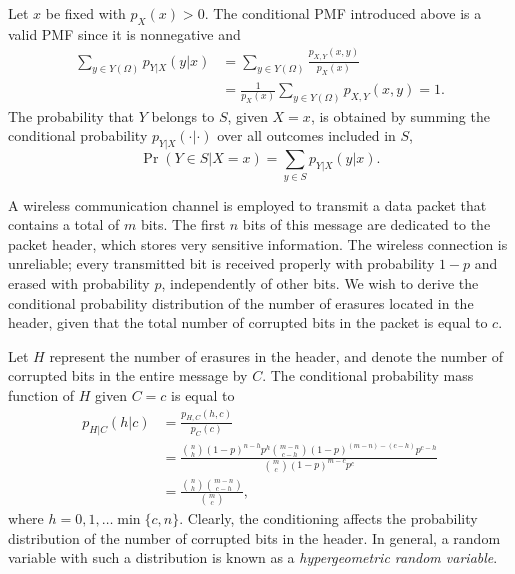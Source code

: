 Let $x$ be fixed with $p_X (x) > 0$.
The conditional PMF introduced above is a valid PMF since it is nonnegative and
\begin{equation*}
\begin{split}
\sum_{y \in Y(\Omega)} p_{Y|X} (y|x)
&= \sum_{y \in Y(\Omega)} \frac{p_{X,Y} (x,y)}{p_X (x)} \\
&= \frac{1}{p_X (x)} \sum_{y \in Y(\Omega)} p_{X,Y} (x,y) = 1.
\end{split}
\end{equation*}
The probability that $Y$ belongs to $S$, given $X = x$, is obtained by summing the conditional probability $p_{Y|X} (\cdot | \cdot)$ over all outcomes included in $S$,
\begin{equation*}
\Pr (Y \in S | X = x) = \sum_{y \in S} p_{Y|X} (y | x) .
\end{equation*}

\begin{example}
A wireless communication channel is employed to transmit a data packet that contains a total of $m$ bits.
The first $n$ bits of this message are dedicated to the packet header, which stores very sensitive information.
The wireless connection is unreliable; every transmitted bit is received properly with probability $1-p$ and erased with probability $p$, independently of other bits.
We wish to derive the conditional probability distribution of the number of erasures located in the header, given that the total number of corrupted bits in the packet is equal to $c$.

Let $H$ represent the number of erasures in the header, and denote the number of corrupted bits in the entire message by $C$.
The conditional probability mass function of $H$ given $C = c$ is equal to
\begin{equation*}
\begin{split}
p_{H|C} (h|c) &= \frac{p_{H,C} (h,c)}{p_C (c)} \\
&= \frac{\binom{n}{h} (1-p)^{n-h} p^h
\binom{m-n}{c-h} (1-p)^{(m-n)-(c-h)} p^{c - h}}{\binom{m}{c} (1-p)^{m-c} p^c} \\
&= \frac{\binom{n}{h} \binom{m-n}{c-h}}{\binom{m}{c}} ,
\end{split}
\end{equation*}
where $h = 0, 1, \ldots \min \{ c, n \}$.
Clearly, the conditioning affects the probability distribution of the number of corrupted bits in the header.
In general, a random variable with such a distribution is known as a \emph{hypergeometric random variable}. 
\end{example}

